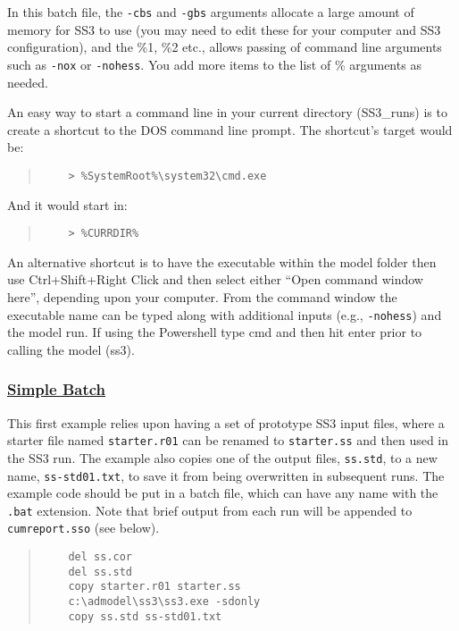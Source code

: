 In this batch file, the \texttt{-cbs} and \texttt{-gbs} arguments allocate a large amount of memory for SS3 to use (you may need to edit these for your computer and SS3 configuration), and the \%1, \%2 etc., allows passing of command line arguments such as \texttt{-nox} or \texttt{-nohess}. You add more items to the list of \% arguments as needed.

An easy way to start a command line in your current directory (SS3\_runs) is to create a shortcut to the DOS command line prompt. The shortcut's target would be:

\begin{quote}
	\begin{verbatim}
	> %SystemRoot%\system32\cmd.exe
	\end{verbatim}
\end{quote}


\noindent And it would start in:
\begin{quote}
	\begin{verbatim}
	> %CURRDIR%
	\end{verbatim}
\end{quote}

An alternative shortcut is to have the executable within the model folder then use Ctrl+Shift+Right Click and then select either ``Open command window here'', depending upon your computer. From the command window the executable name can be typed along with additional inputs (e.g., \texttt{-nohess}) and the model run. If using the Powershell type cmd and then hit enter prior to calling the model (ss3). 

\hypertarget{SimpleBatch}{}
\subsubsection[Simple Batch]{\protect\hyperlink{SimpleBatch}{Simple Batch}}

This first example relies upon having a set of prototype SS3 input files, where a starter file named \texttt{starter.r01} can be renamed to \texttt{starter.ss} and then used in the SS3 run. The example also copies one of the output files, \texttt{ss.std}, to a new name, \texttt{ss-std01.txt}, to save it from being overwritten in subsequent runs. The example code should be put in a batch file, which can have any name with the \texttt{.bat} extension. Note that brief output from each run will be appended to \texttt{cumreport.sso} (see below).

\begin{quote}
	\begin{verbatim}
	del ss.cor
	del ss.std
	copy starter.r01 starter.ss
	c:\admodel\ss3\ss3.exe -sdonly
	copy ss.std ss-std01.txt
	\end{verbatim}
\end{quote}

